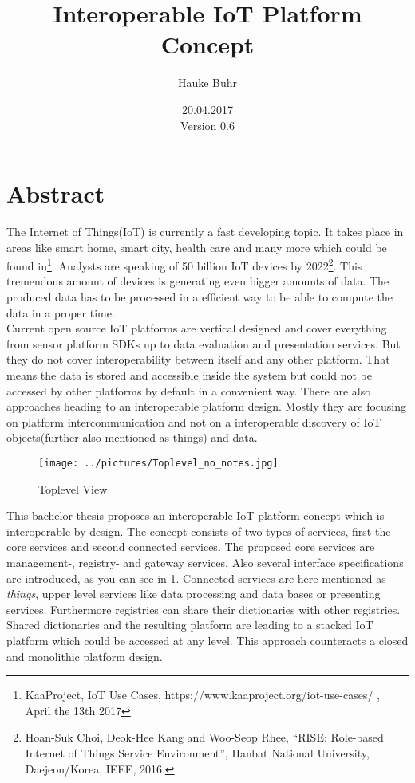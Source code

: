 \documentclass[11pt]{article}
\title{\textbf{Interoperable IoT Platform Concept}}
\author{Hauke Buhr}
\date{20.04.2017 \\ Version 0.6}
\begin{document}
\maketitle

\section{Abstract}
The Internet of Things(IoT) is currently a fast developing topic. It takes place in areas like smart home, smart city, health care and many
more which could be found in\footnote[3]{KaaProject, IoT Use Cases, https://www.kaaproject.org/iot-use-cases/ , April the 13th 2017}.
Analysts are speaking of 50 billion IoT devices by 2022\footnote[1]{Hoan-Suk Choi, Deok-Hee Kang and Woo-Seop Rhee, “RISE: Role-based
Internet of Things Service Environment”, Hanbat National University, Daejeon/Korea, IEEE, 2016.}. This tremendous amount of devices is generating even bigger amounts of data. The produced data has to be processed in a efficient way to be able to compute the data in a proper time. \\

Current open source IoT platforms are vertical designed and cover everything from sensor platform SDKs up to data evaluation and
presentation services. But they do not cover interoperability between itself and any other platform. That means the data is stored and
accessible inside the system but could not be accessed by other platforms by default in a convenient way. There are also approaches
heading to an interoperable platform design. Mostly they are focusing on platform intercommunication and not on a interoperable discovery of
IoT objects(further also mentioned as things) and data.
\\

\begin{figure}[ht]
	\centering
  \texttt{[image: ../pictures/Toplevel\_no\_notes.jpg]}
  	\caption{Toplevel View}
	\label{fig:toplevel}
\end{figure}
This bachelor thesis proposes an interoperable IoT platform concept which is interoperable by design. The concept consists of two types of
services, first the core services and second connected services.
The proposed core services are management-, registry- and gateway services. Also several interface specifications are introduced, as you
can see in \ref{fig:toplevel}. Connected services are here mentioned as \textit{things}, upper level services like data processing and data
bases or presenting services. Furthermore registries can share their dictionaries with other registries. Shared dictionaries and the
resulting platform are leading to a stacked IoT platform which could be accessed at any level.
This approach counteracts a closed and monolithic platform design.
\\
\end{document}
